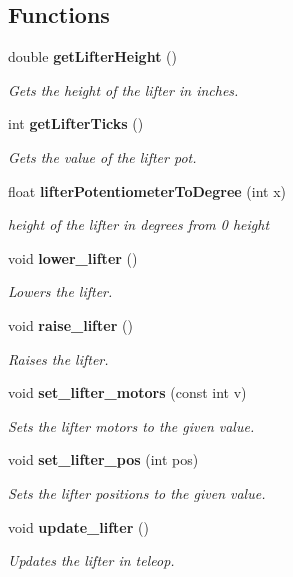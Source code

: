 \subsection*{Functions}
\begin{DoxyCompactItemize}
\item 
double \textbf{ get\+Lifter\+Height} ()
\begin{DoxyCompactList}\small\item\em Gets the height of the lifter in inches. \end{DoxyCompactList}\item 
int \textbf{ get\+Lifter\+Ticks} ()
\begin{DoxyCompactList}\small\item\em Gets the value of the lifter pot. \end{DoxyCompactList}\item 
float \textbf{ lifter\+Potentiometer\+To\+Degree} (int x)
\begin{DoxyCompactList}\small\item\em height of the lifter in degrees from 0 height \end{DoxyCompactList}\item 
void \textbf{ lower\+\_\+lifter} ()
\begin{DoxyCompactList}\small\item\em Lowers the lifter. \end{DoxyCompactList}\item 
void \textbf{ raise\+\_\+lifter} ()
\begin{DoxyCompactList}\small\item\em Raises the lifter. \end{DoxyCompactList}\item 
void \textbf{ set\+\_\+lifter\+\_\+motors} (const int v)
\begin{DoxyCompactList}\small\item\em Sets the lifter motors to the given value. \end{DoxyCompactList}\item 
void \textbf{ set\+\_\+lifter\+\_\+pos} (int pos)
\begin{DoxyCompactList}\small\item\em Sets the lifter positions to the given value. \end{DoxyCompactList}\item 
void \textbf{ update\+\_\+lifter} ()
\begin{DoxyCompactList}\small\item\em Updates the lifter in teleop. \end{DoxyCompactList}\end{DoxyCompactItemize}


